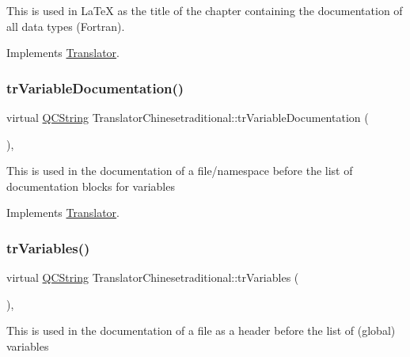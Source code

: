 This is used in La\+TeX as the title of the chapter containing the documentation of all data types (Fortran). 

Implements \mbox{\hyperlink{class_translator}{Translator}}.

\mbox{\label{class_translator_chinesetraditional_ae5208cf0363e243cbdfe3a807617a5eb}} 
\subsubsection{\texorpdfstring{trVariableDocumentation()}{trVariableDocumentation()}}
{\footnotesize\ttfamily virtual \mbox{\hyperlink{class_q_c_string}{Q\+C\+String}} Translator\+Chinesetraditional\+::tr\+Variable\+Documentation (\begin{DoxyParamCaption}{ }\end{DoxyParamCaption})\hspace{0.3cm}{\ttfamily [inline]}, {\ttfamily [virtual]}}

This is used in the documentation of a file/namespace before the list of documentation blocks for variables 

Implements \mbox{\hyperlink{class_translator}{Translator}}.

\mbox{\label{class_translator_chinesetraditional_af9364497af3826f519b7e5811e9e6a0d}} 
\subsubsection{\texorpdfstring{trVariables()}{trVariables()}}
{\footnotesize\ttfamily virtual \mbox{\hyperlink{class_q_c_string}{Q\+C\+String}} Translator\+Chinesetraditional\+::tr\+Variables (\begin{DoxyParamCaption}{ }\end{DoxyParamCaption})\hspace{0.3cm}{\ttfamily [inline]}, {\ttfamily [virtual]}}

This is used in the documentation of a file as a header before the list of (global) variables 


